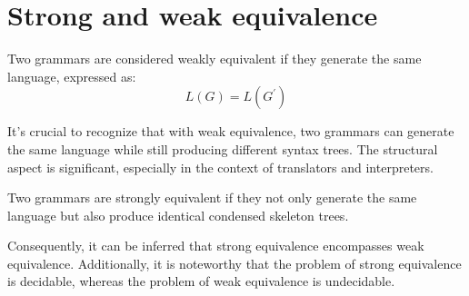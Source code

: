 \section{Strong and weak equivalence}

\begin{definition}
    Two grammars are considered weakly equivalent if they generate the same language, expressed as:
    \[L(G)=L(G^{\prime})\]
\end{definition}
It's crucial to recognize that with weak equivalence, two grammars can generate the same language while still producing different syntax trees. 
The structural aspect is significant, especially in the context of translators and interpreters.
\begin{definition}
    Two grammars are strongly equivalent if they not only generate the same language but also produce identical condensed skeleton trees.
\end{definition}
Consequently, it can be inferred that strong equivalence encompasses weak equivalence. 
Additionally, it is noteworthy that the problem of strong equivalence is decidable, whereas the problem of weak equivalence is undecidable.